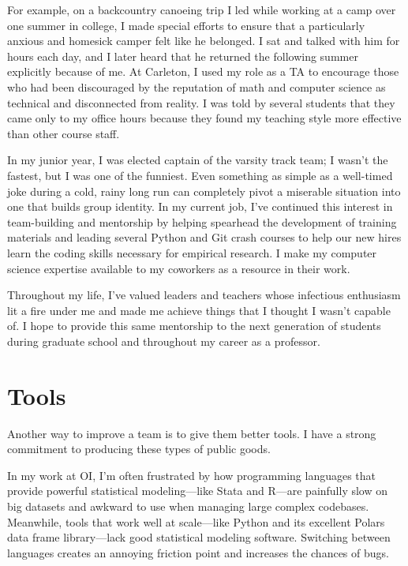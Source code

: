 \documentclass{grad-statement}
\begin{document}
For example, on a backcountry canoeing trip I led while working at a camp over one summer in college, I made special efforts to ensure that a particularly anxious and homesick camper felt like he belonged.
I sat and talked with him for hours each day, and I later heard that he returned the following summer explicitly because of me.
At Carleton, I used my role as a TA to encourage those who had been discouraged by the reputation of math and computer science as technical and disconnected from reality.
I was told by several students that they came only to my office hours because they found my teaching style more effective than other course staff.

In my junior year, I was elected captain of the varsity track team;
I wasn't the fastest, but I was one of the funniest.
Even something as simple as a well-timed joke during a cold, rainy long run can completely pivot a miserable situation into one that builds group identity.
In my current job, I've continued this interest in team-building and mentorship by helping spearhead the development of training materials and leading several Python and Git crash courses to help our new hires learn the coding skills necessary for empirical research.
I make my computer science expertise available to my coworkers as a resource in their work.

Throughout my life, I've valued leaders and teachers whose infectious enthusiasm lit a fire under me and made me achieve things that I thought I wasn't capable of.
I hope to provide this same mentorship to the next generation of students during graduate school and throughout my career as a professor.

\section{Tools}

Another way to improve a team is to give them better tools.
I have a strong commitment to producing these types of public goods.

In my work at OI, I'm often frustrated by how programming languages that provide powerful statistical modeling---like Stata and R---are painfully slow on big datasets and awkward to use when managing large complex codebases.
Meanwhile, tools that work well at scale---like Python and its excellent Polars data frame library---lack good statistical modeling software.
Switching between languages creates an annoying friction point and increases the chances of bugs.
\end{document}
